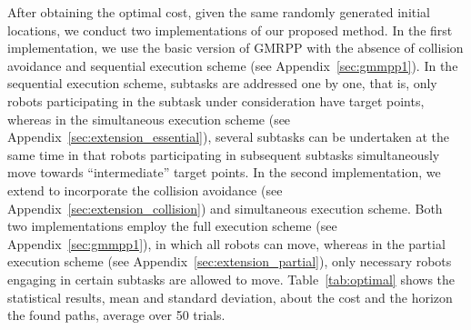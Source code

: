 \documentclass[Afour,sageh,times]{sagej}
\begin{document}
{{\begin{table}[!t]
  \label{tab:optimal}
  \centering
\end{table}

After obtaining the optimal cost, given the same randomly generated initial locations,  we conduct two implementations of our proposed method. In the first implementation, we use the basic version of GMRPP with the absence of collision avoidance and sequential execution scheme (see Appendix~\ref{sec:gmmpp1}). In the sequential execution scheme, subtasks are addressed one by one, that is, only robots participating in the subtask under consideration have target points, whereas in the simultaneous execution scheme (see Appendix~\ref{sec:extension_essential}), several subtasks can be undertaken at the same time in that  robots participating in subsequent subtasks simultaneously  move towards ``intermediate'' target points. In the second implementation, we extend to incorporate the collision avoidance (see Appendix~\ref{sec:extension_collision}) and simultaneous execution scheme.  Both two implementations employ the full execution scheme (see Appendix~\ref{sec:gmmpp1}), in which all robots can move, whereas in the partial execution scheme (see Appendix~\ref{sec:extension_partial}), only necessary robots engaging in certain subtasks are allowed to move.  Table~\ref{tab:optimal} shows the statistical results, mean and standard deviation, about the cost and the horizon the found paths, average over 50 trials.

}}
\end{document}
